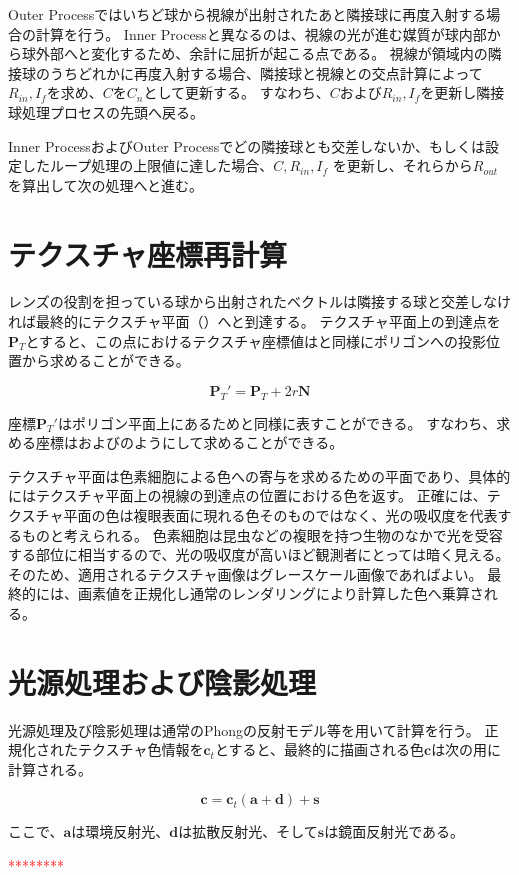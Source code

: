 Outer Processではいちど球から視線が出射されたあと隣接球に再度入射する場合の計算を行う。
Inner Processと異なるのは、視線の光が進む媒質が球内部から球外部へと変化するため、余計に屈折が起こる点である。
視線が領域内の隣接球のうちどれかに再度入射する場合、隣接球と視線との交点計算によって$R_{in}, I_f$を求め、$C$を$C_n$として更新する。
すなわち、$C$および$R_{in}, I_f$を更新し隣接球処理プロセスの先頭へ戻る。

Inner ProcessおよびOuter Processでどの隣接球とも交差しないか、もしくは設定したループ処理の上限値に達した場合、$C, R_{in}, I_f$
を更新し、それらから$R_{out}$を算出して次の処理へと進む。

\section{テクスチャ座標再計算}
\label{STexturerecalculation}

レンズの役割を担っている球から出射されたベクトルは隣接する球と交差しなければ最終的にテクスチャ平面（）へと到達する。
テクスチャ平面上の到達点を$\bm{P}_T$とすると、この点におけるテクスチャ座標値はと同様にポリゴンへの投影位置から求めることができる。

\begin{equation}
\label{EPtdash}
\bm{P}_T' = \bm{P}_T + 2r\bm{N}
\end{equation}

\noindent
座標$\bm{P}_T'$はポリゴン平面上にあるためと同様に表すことができる。
すなわち、求める座標はおよびのようにして求めることができる。


テクスチャ平面は色素細胞による色への寄与を求めるための平面であり、具体的にはテクスチャ平面上の視線の到達点の位置における色を返す。
正確には、テクスチャ平面の色は複眼表面に現れる色そのものではなく、光の吸収度を代表するものと考えられる。
色素細胞は昆虫などの複眼を持つ生物のなかで光を受容する部位に相当するので、光の吸収度が高いほど観測者にとっては暗く見える。
そのため、適用されるテクスチャ画像はグレースケール画像であればよい。
最終的には、画素値を正規化し通常のレンダリングにより計算した色へ乗算される。



\section{光源処理および陰影処理}
\label{SPhongandshade}

光源処理及び陰影処理は通常のPhongの反射モデル等を用いて計算を行う。
正規化されたテクスチャ色情報を$\bm{c}_t$とすると、最終的に描画される色$\bm{c}$は次の用に計算される。

\begin{equation}
\label{EColor}
\bm{c} = \bm{c}_t(\bm{a} + \bm{d}) + \bm{s}
\end{equation}

\noindent
ここで、$\bm{a}$は環境反射光、$\bm{d}$は拡散反射光、そして$\bm{s}$は鏡面反射光である。


\textcolor{red}{********}
